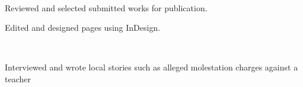 \documentclass[]{hieudo-build}
\begin{document}
\begin{minipage}[t]{1.0\textwidth}
 \\
\begin{tightemize} 
\item Reviewed and selected submitted works for publication.
\item Edited and designed pages using InDesign.
\end{tightemize}
\sectionsep

 \\
\begin{tightemize} 
\item Interviewed and wrote local stories such as alleged molestation charges against a teacher
\end{tightemize}
\sectionsep

\end{minipage}
\end{document}
